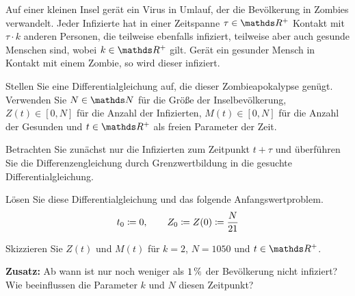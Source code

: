 \begin{atiTask}[
	title = Eine Zombieapokalypse,
	language = Deutsch
]
	Auf einer kleinen Insel gerät ein Virus in Umlauf, der die Bevölkerung in Zombies verwandelt.
	Jeder Infizierte hat in einer Zeitspanne $\tau\in\setReal^+$ Kontakt mit $\tau\cdot k$ anderen Personen, die teilweise ebenfalls infiziert, teilweise aber auch gesunde Menschen sind, wobei $k\in\setReal^+$ gilt.
	Gerät ein gesunder Mensch in Kontakt mit einem Zombie, so wird dieser infiziert.
	\medskip
	\begin{atiSubtasks}
		\item{
			Stellen Sie eine Differentialgleichung auf, die dieser Zombieapokalypse genügt.
			Verwenden Sie $N\in\setNatural$ für die Größe der Inselbevölkerung, $Z(t)\in[0,N]$ für die Anzahl der Infizierten, $M(t)\in[0,N]$ für die Anzahl der Gesunden und $t\in\setReal^+$ als freien Parameter der Zeit.

			\begin{atiNote}
				Betrachten Sie zunächst nur die Infizierten zum Zeitpunkt $t+\tau$ und überführen Sie die Differenzengleichung durch Grenzwertbildung in die gesuchte Differentialgleichung.
			\end{atiNote}
		}
		\item{
			Lösen Sie diese Differentialgleichung und das folgende Anfangswertproblem.
			\[
				t_0\coloneqq 0,\qquad Z_0\coloneqq Z(0) \coloneqq \frac{N}{21}
			\]
		}
		\item{
			Skizzieren Sie $Z(t)$ und $M(t)$ für $k=2$, $N=1050$ und $t\in\setReal^+$.
		}
		\item{
			\textbf{Zusatz:} Ab wann ist nur noch weniger als $1\, \mathrm{\%}$ der Bevölkerung nicht infiziert?
			Wie beeinflussen die Parameter $k$ und $N$ diesen Zeitpunkt?
		}
	\end{atiSubtasks}
\end{atiTask}
